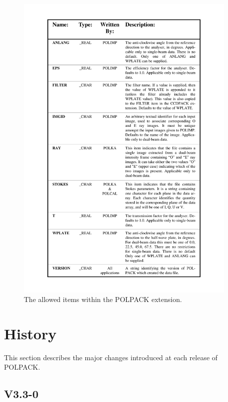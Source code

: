 \documentclass[twoside,11pt]{starlink}
\begin{document}
  \begin{figure}[htbp]
  \begin{center}
  \includegraphics[clip,width=0.95\textwidth]{sun223_figures/polext}
  \caption{The allowed items within the POLPACK extension.}
  \label{fig:polext}
  \end{center}
  \end{figure}

\section{\label{APP:HISTORY}History}
This section describes the major changes introduced at each release of
POLPACK.



\subsection{V3.3-0}
\end{document}
